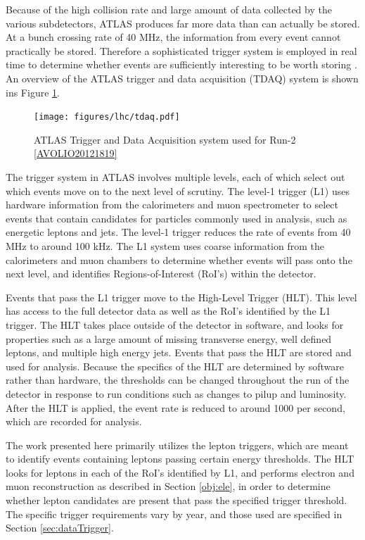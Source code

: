 Because of the high collision rate and large amount of data collected by the various subdetectors, ATLAS produces far more data than can actually be stored. At a bunch crossing rate of 40 MHz, the information from every event cannot practically be stored. Therefore a sophisticated trigger system is employed in real time to determine whether events are sufficiently interesting to be worth storing \cite{PERF-2011-02}. An overview of the ATLAS trigger and data acquisition (TDAQ) system is shown ins Figure \ref{fig:tdaq}.

\begin{figure}[H]
\centering
   \texttt{[image: figures/lhc/tdaq.pdf]}
\caption{ATLAS Trigger and Data Acquisition system used for Run-2 \ref{AVOLIO20121819}}
\label{fig:tdaq}
\end{figure}

The trigger system in ATLAS involves multiple levels, each of which select out which events move on to the next level of scrutiny. The level-1 trigger (L1) uses hardware information from the calorimeters and muon spectrometer to select events that contain candidates for particles commonly used in analysis, such as energetic leptons and jets. The level-1 trigger reduces the rate of events from 40 MHz to around 100 kHz. The L1 system uses coarse information from the calorimeters and muon chambers to determine whether events will pass onto the next level, and identifies Regions-of-Interest (RoI's) within the detector. 

Events that pass the L1 trigger move to the High-Level Trigger (HLT). This level has access to the full detector data as well as the RoI's identified by the L1 trigger. The HLT takes place outside of the detector in software, and looks for properties such as a large amount of missing transverse energy, well defined leptons, and multiple high energy jets. Events that pass the HLT are stored and used for analysis. Because the specifics of the HLT are determined by software rather than hardware, the thresholds can be changed throughout the run of the detector in response to run conditions such as changes to pilup and luminosity. After the HLT is applied, the event rate is reduced to around 1000 per second, which are recorded for analysis.

The work presented here primarily utilizes the lepton triggers, which are meant to identify events containing leptons passing certain energy thresholds. The HLT looks for leptons in each of the RoI's identified by L1, and performs electron and muon reconstruction as described in Section \ref{obj:ele}, in order to determine whether lepton candidates are present that pass the specified trigger threshold. The specific trigger requirements vary by year, and those used are specified in Section \ref{sec:dataTrigger}.
